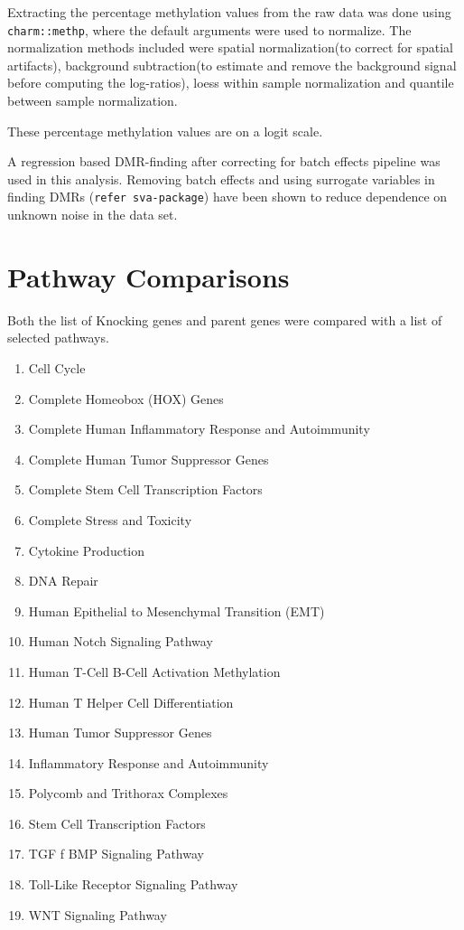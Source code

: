 \documentclass[11pt]{article}
\begin{document}
Extracting the percentage methylation values from the raw data was done using {\tt charm::methp}, where the default arguments were used to normalize. The normalization methods included were spatial normalization(to correct for spatial artifacts), background subtraction(to estimate and remove the background signal before computing the log-ratios), loess within sample normalization and quantile between sample normalization.

These percentage methylation values are on a logit scale.

A regression based DMR-finding after correcting for batch effects pipeline was used in this analysis. Removing batch effects and using surrogate variables in finding DMRs ({\tt refer sva-package}) have been shown to reduce dependence on unknown noise in the data set.



\section*{Pathway Comparisons}

Both the list of Knocking genes and parent genes were compared with a list of selected pathways.

\begin{enumerate}
\item Cell Cycle                                 
\item Complete Homeobox (HOX) Genes                      
\item Complete Human Inflammatory Response and Autoimmunity 
\item Complete Human Tumor Suppressor Genes              
\item Complete Stem Cell Transcription Factors            
\item Complete Stress and Toxicity                         
\item Cytokine Production                                
\item DNA Repair 
\item Human Epithelial to Mesenchymal Transition (EMT)    
\item Human Notch Signaling Pathway                      
\item Human T-Cell B-Cell Activation Methylation         
\item Human T Helper Cell Differentiation                
\item Human Tumor Suppressor Genes                        
\item Inflammatory Response and Autoimmunity               
\item Polycomb and Trithorax Complexes                     
\item Stem Cell Transcription Factors                    
\item TGF f BMP Signaling Pathway                          
\item Toll-Like Receptor Signaling Pathway               
\item WNT Signaling Pathway                              
\end{enumerate}
\end{document}
